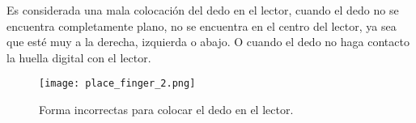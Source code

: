 Es considerada una mala colocación del dedo en el lector, cuando el dedo no se encuentra completamente plano, no se encuentra en el centro del lector, ya sea que esté muy a la derecha, izquierda o abajo. O cuando el dedo no haga contacto la huella digital con el lector.

\begin{figure}[htb]
 \begin{center}
  \texttt{[image: place\_finger\_2.png]}
 \end{center}
 \caption{Forma incorrectas para colocar el dedo en el lector.}
 \label{fig:finger_print_11}
\end{figure}